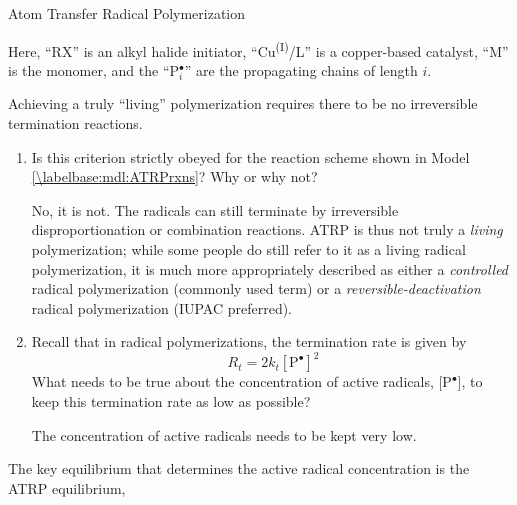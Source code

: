 \begin{activity}{Atom Transfer Radical Polymerization}
\begin{model}
	Here, ``RX'' is an alkyl halide initiator, ``Cu\textsuperscript{(I)}/L'' is a copper-based catalyst, ``M'' is the monomer, and the ``P$_i^\bullet$'' are the propagating chains of length $i$.
	
\end{model}


\begin{ctqs}

	\question Achieving a truly ``living'' polymerization requires there to be no irreversible termination reactions.
	
		\begin{enumerate}
		
			\item Is this criterion strictly obeyed for the reaction scheme shown in Model \ref{\labelbase:mdl:ATRPrxns}?  Why or why not?  \label{\labelbase:ctq:terminationsuprression}
			
				\begin{solution}[1.25in]{}
				
					No, it is not.  The radicals can still terminate by irreversible disproportionation or combination reactions.
					ATRP is thus not truly a \emph{living} polymerization; while some people do still refer to it as a living radical polymerization, it is much more appropriately described as either a \emph{controlled} radical polymerization (commonly used term) or a \emph{reversible-deactivation} radical polymerization (IUPAC preferred).
				
				\end{solution}
			
			\item Recall that in radical polymerizations, the termination rate is given by
				\begin{equation*}\
					R_t = 2k_t[\text{P}^\bullet]^2
				\end{equation*}
				What needs to be true about the concentration of active radicals, [P$^\bullet$], to keep this termination rate as low as possible?
				
				\begin{solution}[0.9in]{}
				
					The concentration of active radicals needs to be kept very low.
				
				\end{solution}
			
		\end{enumerate}
	
	\question The key equilibrium that determines the active radical concentration is the ATRP equilibrium,
	

\end{ctqs}
\end{activity}

